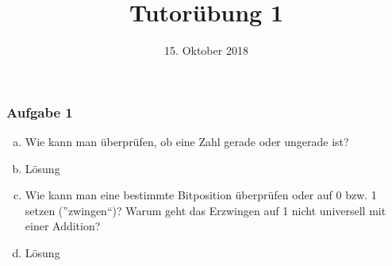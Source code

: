%
% 
% 
%







\newcommand{\Datum}{\today}

\renewcommand{\PraesentationFusszeileZusatz}{| Tutorium Einführung in die Rechnerarchitektur WS 2018/2019}

\title{Tutorübung 1}
\author{\PersonVorname{} \PersonNachname}
\institute[]{\UniversitaetName \\ \FakultaetName}
\date[\Datum]{15. Oktober 2018}



\setlength{\baselineskip}{\PraesentationAbstandAbsatz}
\setlength{\parskip}{\baselineskip}

\PraesentationMasterStandard

\PraesentationTitelseite %

\begin{frame}
    \frametitle{Aufgabe 1}
    \vspace{0.5cm}

    \begin{enumerate}[(a)]
        \item<1-> Wie kann man überprüfen, ob eine Zahl gerade oder ungerade ist?
        \item<2->[] Lösung
        \item<3-> Wie kann man eine bestimmte Bitposition überprüfen 
            oder auf 0 bzw. 1 setzen (”zwingen“)? 
            Warum geht das Erzwingen auf 1 nicht universell mit einer Addition?
        \item<4->[] Lösung 
    \end{enumerate}
\end{frame}

